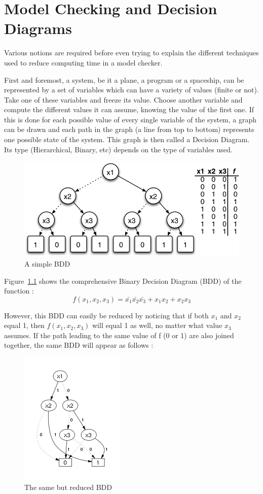 \documentclass[12pt]{report}
\begin{document}
\chapter{Model Checking and Decision Diagrams}

Various notions are required before even trying to explain the different techniques used to reduce computing time in a model checker.

First and foremost, a system, be it a plane, a program or a spaceship, can be represented by a set of variables which can have a variety of values (finite or not). Take one of these variables and freeze its value. Choose another variable and compute the different values it can assume, knowing the value of the first one. If this is done for each possible value of every single variable of the system, a graph can be drawn and each path in the graph (a line from top to bottom) represents one possible state of the system. This graph is then called a Decision Diagram. Its type (Hierarchical, Binary, etc) depends on the type of variables used.

\begin{figure}[!h]
  \centering
  \includegraphics[scale=0.4]{images/basic_bdd.jpg}
  \caption{A simple BDD}
  \label{basic_bdd}
\end{figure}

Figure~\ref{basic_bdd} shows the comprehensive Binary Decision Diagram (BDD) of the function :
\[f(x_1,x_2,x_3) = \bar{x_1}\bar{x_2}\bar{x_3} + x_1x_2 + x_2x_3\]

However, this BDD can easily be reduced by noticing that if both $x_1$ and $x_2$ equal 1, then $f(x_1, x_2, x_3)$ will equal 1 as well, no matter what value $x_3$ assumes. If the path leading to the same value of f (0 or 1) are also joined together, the same BDD will appear as follows :

\begin{figure}[!h]
  \centering
  \includegraphics[scale=0.8]{images/compact_bdd.jpg}
  \caption{The same but reduced BDD}
  \label{compact_bdd}
\end{figure}
\end{document}
